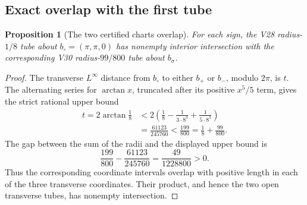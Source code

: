 \documentclass[11pt,oneside]{article}
\newtheorem{proposition}[theorem]{Proposition}
\theoremstyle{definition}
\theoremstyle{remark}
\begin{document}
\subsection{Exact overlap with the first tube}

\begin{proposition}[The two certified charts overlap]
\label{prop:newv30-overlap}
For each sign, the V28 radius-\(1/8\) tube about
\(b_\circ=(\pi,\pi,0)\) has nonempty interior intersection with the
corresponding V30 radius-\(99/800\) tube about \(b_\sigma\).
\end{proposition}

\begin{proof}
The transverse \(L^\infty\) distance from \(b_\circ\) to either
\(b_+\) or \(b_-\), modulo \(2\pi\), is \(t\).  The alternating
series for \(\arctan x\), truncated after its positive \(x^5/5\)
term, gives the strict rational upper bound
\[
\begin{split}
 t=2\arctan\frac18
 &<2\left(\frac18-\frac1{3\cdot8^3}
                    +\frac1{5\cdot8^5}\right)\\
 &=\frac{61123}{245760}
 <\frac{199}{800}
 =\frac18+\frac{99}{800}.
\end{split}                                             \tag{30.17}
\]
The gap between the sum of the radii and the displayed upper bound
is
\[
 \frac{199}{800}-\frac{61123}{245760}
 =\frac{49}{1228800}>0.                                \tag{30.18}
\]
Thus the corresponding coordinate intervals overlap with positive
length in each of the three transverse coordinates.  Their product,
and hence the two open transverse tubes, has nonempty intersection.
\end{proof}
\end{document}
